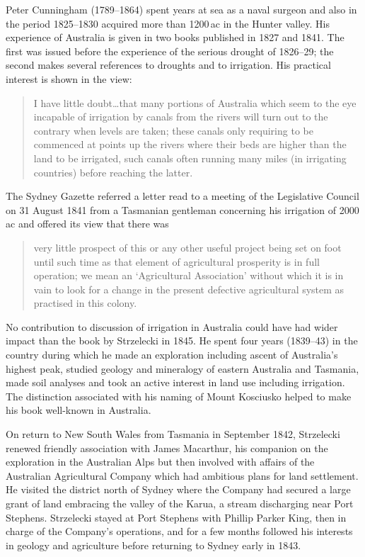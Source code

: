 Peter Cunningham (1789--1864) spent years at sea as a naval surgeon
and also in the period 1825--1830 acquired more than 1200\,ac in
the Hunter valley.  His experience of Australia is given in two books
published in 1827 and 1841.  The first was issued before the
experience of the serious drought of 1826--29; the second makes
several references to droughts and to irrigation. His practical
interest is shown in the view:
\begin{quote}
	I have little doubt\ldots that many portions of Australia
	which seem to the eye incapable of irrigation by canals from
	the rivers will turn out to the contrary when levels are
	taken; these canals only requiring to be commenced at points
	up the rivers where their beds are higher than the land to be
	irrigated, such canals often running many miles (in irrigating
	countries) before reaching the latter.
\end{quote}

The Sydney Gazette referred a letter read to a meeting of the
Legislative Council on 31 August 1841 from a Tasmanian gentleman
concerning his irrigation of 2000\,ac and offered its view that there
was
\begin{quote}
	very little prospect of this or any other useful project being
	set on foot until such time as that element of agricultural
	prosperity is in full operation; we mean an `Agricultural
	Association' without which it is in vain to look for a change
	in the present defective agricultural system as practised in
	this colony.
\end{quote}

No contribution to discussion of irrigation in Australia could have
had wider impact than the book by Strzelecki in 1845.  He spent four
years (1839--43) in the country during which he made an exploration
including ascent of Australia's highest peak, studied geology and
mineralogy of eastern Australia and Tasmania, made soil analyses and
took an active interest in land use including irrigation.  The
distinction associated with his naming of Mount Kosciusko helped to
make his book well-known in Australia.

On return to New South Wales from Tasmania in September 1842,
Strzelecki renewed friendly association with James Macarthur, his
companion on the exploration in the Australian Alps but then involved
with affairs of the Australian Agricultural Company which had
ambitious plans for land settlement.  He visited the district north of
Sydney where the Company had secured a large grant of land embracing
the valley of the Karua, a stream discharging near Port Stephens.
Strzelecki stayed at Port Stephens with Phillip Parker King, then in
charge of the Company's operations, and for a few months followed his
interests in geology and agriculture before returning to Sydney early
in 1843.

